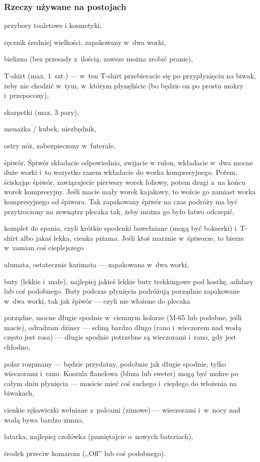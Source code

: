 \subsubsection{Rzeczy używane na postojach\label{na_postojach}}
\begin{checklist}
\item przybory toaletowe i kosmetyki,
\item ręcznik średniej wielkości, zapakowany w~dwa worki,
\item bielizna (bez przesady z~ilością, zawsze można zrobić pranie),
\item T-shirt (max. 1~szt.) --- w~ten T-shirt przebieracie się po przypłynięciu na biwak, żeby nie chodzić w~tym, w~którym płynęliście (bo będzie on po prostu mokry i~przepocony),
\item skarpetki (max. 3 pary),
\item menażka / kubek, niezbędnik,
\item ostry nóż, zabezpieczony w~futerale,
\item śpiwór. Śpiwór składacie odpowiednio, zwijacie w rulon, wkładacie w~dwa mocne duże worki i~to wszystko razem wkładacie do worka kompresyjnego. Potem, ściskając śpiwór, zawiązujecie pierwszy worek foliowy, potem drugi a~na końcu worek kompresyjny. Jeśli macie mały worek kajakowy, to weźcie go zamiast worka kompresyjnego od śpiwora. Tak zapakowany śpiwór na czas podróży ma być przytroczony na zewnątrz plecaka tak, żeby można go było łatwo odczepić,
\item komplet do spania, czyli krótkie spodenki bawełniane (mogą być bokserki) i~T-shirt albo jakaś lekka, cienka piżama. Jeśli ktoś marznie w~śpiworze, to bierze w~zamian coś cieplejszego
\item alumata, ostatecznie karimata --- zapakowana w~dwa worki,
\item buty (lekkie i~małe), najlepiej jakieś lekkie buty trekkingowe pod kostkę, adidasy lub coś podobnego. Buty podczas płynięcia podróżują porządnie zapakowane w~dwa worki, tak jak śpiwór --- czyli nie włożone do plecaka
\item porządne, mocne długie spodnie w~ciemnym kolorze (M-65 lub podobne, jeśli macie), odradzam dżinsy --- schną bardzo długo (rano i~wieczorem nad wodą często jest rosa) --- długie spodnie potrzebne są wieczorami i~rano, gdy jest chłodno,
\item polar rozpinany --- będzie przydatny, podobnie jak długie spodnie, tylko wieczorami i~rano. Koszula flanelowa (bluza lub sweter) mogą być mokre po całym dniu płynięcia --- musicie mieć coś suchego i~ciepłego do włożenia na biwakach,
\item cienkie rękawiczki wełniane z~palcami (zimowe) --- wieczorami i~w~nocy nad wodą bywa bardzo zimno,
\item latarka, najlepiej czołówka (pamiętajcie o~nowych bateriach),
\item środek przeciw komarom (,,Off'' lub coś podobnego).
\end{checklist}

